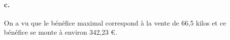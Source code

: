\documentclass[10pt]{article}
\begin{document}
\begin{center}
\end{center}

\paragraph{c.} On a vu que le bénéfice maximal correspond à la vente de 66{,}5 kilos et ce bénéfice se monte à environ 342{,}23 €.
\end{document}
